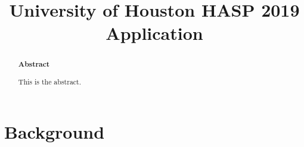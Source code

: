 \documentclass[aps,superscriptaddress,floatfix,nofootinbib,showpacs,amsmath,amssymb,altaffilletter,floatfix,onecolumn]{revtex4-1}
\begin{document}
\title{University of Houston HASP 2019 Application}

\begin{abstract}
  \begin{center}
    {\bf Abstract}
  \end{center}
  
  This is the abstract.
  
  \newpage %
\end{abstract}


\setlength{\parindent}{1em}
\setdefaultleftmargin{1em}{1em}{}{}{}{}
\setcounter{page}{0}\thispagestyle{empty}
\maketitle
\onecolumngrid
\setcounter{tocdepth}{2}
\setcounter{page}{0}\thispagestyle{empty}
\tableofcontents
\setcounter{page}{0}\thispagestyle{empty}
\newpage

	
	\section{Background}
		
		

		
		
		
		
		
		









	

\end{document}
